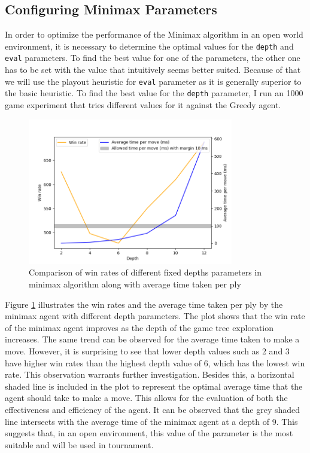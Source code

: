 \subsection{Configuring Minimax Parameters}

In order to optimize the performance of the Minimax algorithm in an open world environment, it is necessary to determine the optimal values for the \texttt{depth} and \texttt{eval} parameters. To find the best value for one of the parameters, the other one has to be set with the value that intuitively seems better suited. Because of that we will use the playout heuristic for \texttt{eval} parameter as it is generally superior to the basic heuristic. To find the best value for the \texttt{depth} parameter, I run an 1000 game experiment that tries different values for it against the Greedy agent. 

\begin{figure}[h]
  \centering
  \captionsetup{justification=centering}
  \includegraphics[width=0.8\textwidth]{../img/minimax_config_openworld.png}
  \caption{Comparison of win rates of different fixed depths parameters in minimax algorithm along with average time taken per ply}
  \label{minimaxOWDepth}
\end{figure}

Figure \ref{minimaxOWDepth} illustrates the win rates and the average time taken per ply by the minimax agent with different depth parameters. The plot shows that the win rate of the minimax agent improves as the depth of the game tree exploration increases. The same trend can be observed for the average time taken to make a move. However, it is surprising to see that lower depth values such as 2 and 3 have higher win rates than the highest depth value of 6, which has the lowest win rate. This observation warrants further investigation. Besides this, a horizontal shaded line is included in the plot to represent the optimal average time that the agent should take to make a move. This allows for the evaluation of both the effectiveness and efficiency of the agent. It can be observed that the grey shaded line intersects with the average time of the minimax agent at a depth of 9. This suggests that, in an open environment, this value of the parameter is the most suitable and will be used in tournament.

